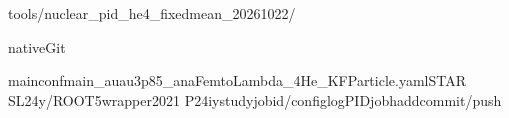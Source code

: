 \documentclass[10pt,a4paper]{article}
\begin{document}
\hspace{0pt}{\jpfont 再現ツール：}\hspace{0pt}tools/\allowbreak{}nuclear\_\allowbreak{}pid\_\allowbreak{}he4\_\allowbreak{}fixedmean\_\allowbreak{}20261022/\allowbreak{}\hspace{0pt}{\jpfont 。}\hspace{0pt}

\hspace{0pt}{\jpfont 設定・係数・選択条件・集約値・各}\hspace{0pt}native\hspace{0pt}{\jpfont 区間の値、ソースとコマンドを同梱。}\hspace{0pt}Git\hspace{0pt}{\jpfont 元ヘッダと候補差分も保存。}\hspace{0pt}

mainconf\hspace{0pt}{\jpfont ：}\hspace{0pt}main\_\allowbreak{}auau3p85\_\allowbreak{}anaFemtoLambda\_\allowbreak{}4He\_\allowbreak{}KFParticle.yaml\hspace{0pt}{\jpfont 。}\hspace{0pt}STAR SL24y/\allowbreak{}ROOT5\hspace{0pt}{\jpfont の既存}\hspace{0pt}wrapper\hspace{0pt}{\jpfont で実行。}\hspace{0pt}2021 P24iy\hspace{0pt}{\jpfont キャッシュのローカル}\hspace{0pt}study\hspace{0pt}{\jpfont で新規}\hspace{0pt}jobid/\allowbreak{}configlog\hspace{0pt}{\jpfont なし。本番}\hspace{0pt}PID\hspace{0pt}{\jpfont 反映・}\hspace{0pt}job\hspace{0pt}{\jpfont 投入・}\hspace{0pt}hadd\hspace{0pt}{\jpfont ・}\hspace{0pt}commit/\allowbreak{}push\hspace{0pt}{\jpfont なし。}\hspace{0pt}


\clearpage
\end{document}
